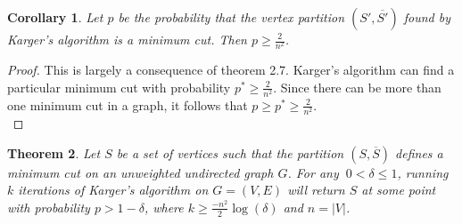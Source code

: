 \documentclass[psamsfonts, 10pt]{amsart}
\newtheorem{thm}{Theorem}[section]
\newtheorem{cor}[thm]{Corollary}
\theoremstyle{definition}
\theoremstyle{remark}
\numberwithin{equation}{section}
\begin{document}
\begin{cor}
Let $p$ be the probability that the vertex partition $(S', \overline{S'})$ found by Karger's algorithm is a minimum cut. Then $p \geq \frac{2}{n^2}$. 
\end{cor}
\begin{proof}
This is largely a consequence of theorem 2.7. Karger's algorithm can find a particular minimum cut with probability $p^* \geq \frac{2}{n^2}$. Since there can be more than one minimum cut in a graph, it follows that $p \geq p^* \geq \frac{2}{n^2}$.
\\
\end{proof}



\begin{thm}
Let $S$ be a set of vertices such that the partition $(S, \overline{S})$ defines a minimum cut on an unweighted undirected graph $G$.  For any $\ 0 < \delta \leq 1$, running $k$ iterations of Karger's algorithm on $G = (V,E)$ will return $S$ at some point with probability $p > 1 - \delta$, where $k \geq \frac{-n^2}{2}\log(\delta)$ and $n = \lvert V \rvert$. 
\end{thm}
\end{document}

